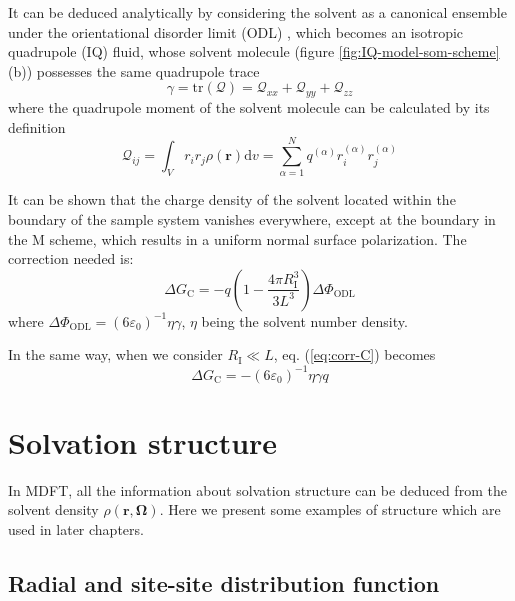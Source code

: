 It can be deduced analytically by considering the solvent as a canonical
ensemble under the orientational disorder limit (ODL) \citep{Kastenholz_2006_I},
which becomes an isotropic quadrupole (IQ) fluid, whose solvent molecule
(figure \ref{fig:IQ-model-som-scheme} (b)) possesses the same quadrupole
trace 
\begin{equation}
\gamma=\mathrm{tr}(\mathbf{\mathcal{Q}})=\mathcal{Q}_{xx}+\mathcal{Q}_{yy}+\mathcal{Q}_{zz}
\end{equation}
where the quadrupole moment of the solvent molecule can be calculated
by its definition \citep{Multipole}
\begin{equation}
\mathcal{Q}_{ij}=\int_{V}r_{i}r_{j}\rho(\mathbf{r})\mathrm{d}v=\sum_{\alpha=1}^{N}q^{(\alpha)}r_{i}^{(\alpha)}r_{j}^{(\alpha)}
\end{equation}

It can be shown that the charge density of the solvent located within
the boundary of the sample system vanishes everywhere, except at the
boundary in the M scheme, which results in a uniform normal surface
polarization. The correction needed is:
\begin{equation}
\Delta G_{\mathrm{C}}=-q\left(1-\frac{4\pi R_{\mathrm{I}}^{3}}{3L^{3}}\right)\Delta\Phi_{\mathrm{ODL}}\label{eq:corr-C}
\end{equation}
where $\Delta\Phi_{\mathrm{ODL}}=\left(6\varepsilon_{0}\right)^{-1}\eta\gamma$,
$\eta$ being the solvent number density.

In the same way, when we consider $R_{\mathrm{I}}\ll L$, eq. (\ref{eq:corr-C})
becomes
\begin{equation}
\Delta G_{\mathrm{C}}=-\left(6\varepsilon_{0}\right)^{-1}\eta\gamma q
\end{equation}


\section{Solvation structure\label{sec:Solvation-structure}}

In MDFT, all the information about solvation structure can be deduced
from the solvent density $\rho(\mathbf{r},\mathbf{\Omega})$. Here we
present some examples of structure which are used in later chapters.

\subsection{Radial and site-site distribution function}

